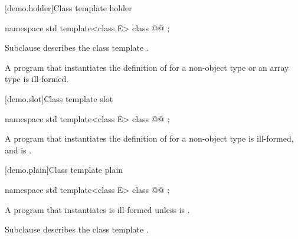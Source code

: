 [demo.holder]{Class template holder}

\begin{codeblock}
namespace std {
  template<class E>
  class @@ {};
}
\end{codeblock}

\pnum
Subclause  describes the class template .

\pnum
A program that instantiates the definition of  for a non-object type or an array type is ill-formed.

[demo.slot]{Class template slot}

\begin{codeblock}
namespace std {
  template<class E>
  class @@ {};
}
\end{codeblock}

\pnum
A program that instantiates the definition of  for a non-object type is ill-formed, and  is .

[demo.plain]{Class template plain}

\begin{codeblock}
namespace std {
  template<class E>
  class @@ {};
}
\end{codeblock}

\pnum
A program that instantiates  is ill-formed unless  is .

\pnum
Subclause  describes the class template .
